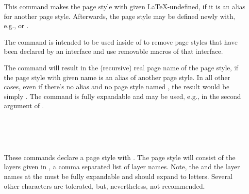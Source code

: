 \begin{Declaration}
\end{Declaration}
%
This command makes the page style with given 
\LaTeX-undefined, if it is an alias for another page style. Afterwards, the
page style may be defined newly with, e.g., 
or . 

The command is intended to be used inside of
 to remove page styles that have been
declared by an interface and use removable macros of that interface.%

\begin{Declaration}
\end{Declaration}
%
The command will result in the (recursive) real page name of the page style,
if the page style with given name  is an alias of
another page style. In all other cases, even if there's no alias and no page
style named , the result would be simply . The command is fully expandable and may be used, e.g., in the
second argument of .%

\begin{Declaration}
  \\
  \\
  \\
\end{Declaration}
%
%
%
%
These commands declare a page style with . The page
style will consist of the layers given in , a comma
separated list of layer names. Note, the  and the
layer names at the  must be fully expandable and should
expand to letters. Several other characters are tolerated, but,
nevertheless, not recommended.

